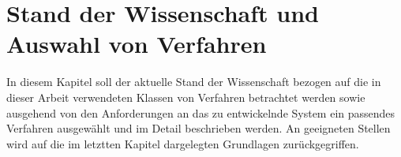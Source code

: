 \chapter{Stand der Wissenschaft und Auswahl von Verfahren}

In diesem Kapitel soll der aktuelle Stand der Wissenschaft bezogen auf die in dieser Arbeit verwendeten Klassen von Verfahren betrachtet werden sowie ausgehend von den Anforderungen an das zu entwickelnde System ein passendes Verfahren ausgewählt und im Detail beschrieben werden. An geeigneten Stellen wird auf die im letztten Kapitel dargelegten Grundlagen zurückgegriffen.

\label{cha_state}







